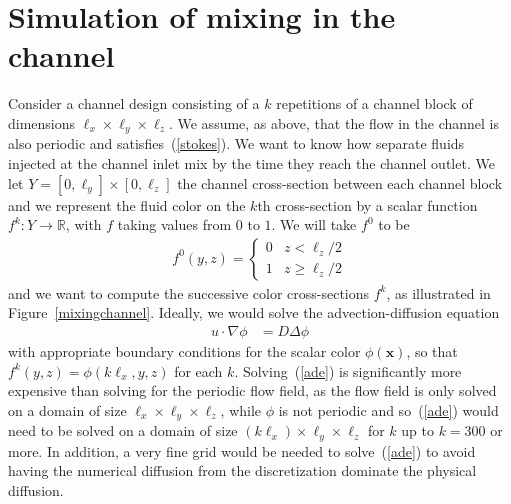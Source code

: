 \documentclass[times]{fldauth}
\begin{document}
\section{Simulation of mixing in the channel}
\label{sec:simu}

Consider a channel design consisting of a $k$ repetitions of a channel
block of dimensions $\ell_x \times \ell_y \times \ell_z$. We assume,
as above, that the flow in the channel is also periodic and
satisfies~(\ref{stokes}). We want to know how separate fluids injected
at the channel inlet mix by the time they reach the channel outlet. We
let $Y = [0,\ell_y]\times[0,\ell_z]$ the channel cross-section between
each channel block and we represent the fluid color on the $k$th
cross-section by a scalar function $f^k : Y \to \mathbb{R}$, with $f$
taking values from $0$ to $1$. We will take $f^0$ to be
\begin{align}
  f^0(y,z) = \begin{cases} 0 & z < \ell_z/2 \\
    1 & z \ge \ell_z/2
  \end{cases}
\end{align}
and we want to compute the successive color cross-sections $f^k$, as
illustrated in Figure~\ref{mixingchannel}. Ideally, we would solve the
advection-diffusion equation
\begin{align}
  \label{ade}
  u \cdot \nabla \phi &= D \Delta \phi
\end{align}
with appropriate boundary conditions for the scalar color
$\phi(\mathbf{x})$, so that $f^k(y,z) = \phi(k\ell_x,y,z)$ for each
$k$. Solving~(\ref{ade}) is significantly more expensive than solving
for the periodic flow field, as the flow field is only solved on a
domain of size $\ell_x \times \ell_y \times \ell_z$, while $\phi$ is
not periodic and so~(\ref{ade}) would need to be solved on a domain of
size $(k \ell_x) \times \ell_y \times \ell_z$ for $k$ up to $k = 300$
or more. In addition, a very fine grid would be needed to
solve~(\ref{ade}) to avoid having the numerical diffusion from the
discretization dominate the physical diffusion.
\end{document}
